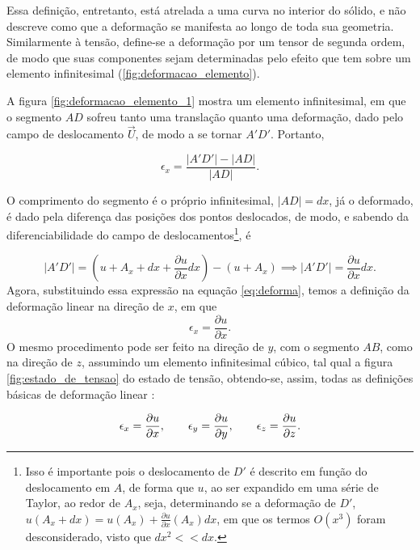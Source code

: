 Essa definição, entretanto, está atrelada a uma curva no interior do sólido, e não descreve como que a deformação se manifesta ao longo de toda sua geometria. Similarmente à tensão, define-se a deformação por um tensor de segunda ordem, de modo que suas componentes sejam determinadas pelo efeito que tem sobre um elemento infinitesimal (\ref{fig:deformacao_elemento}). \cite{roylance}

A figura \ref{fig:deformacao_elemento_1} mostra um elemento infinitesimal, em que o segmento $AD$ sofreu tanto uma translação quanto uma deformação, dado pelo campo de deslocamento $\vec{U}$, de modo a se tornar $A'D'$. Portanto,

\begin{equation}
    \epsilon_x = \frac{|A'D'| - |AD|}{|AD|}.
    \label{eq:deforma}
\end{equation}



O comprimento do segmento é o próprio infinitesimal, $|AD| = dx$, já o deformado, é dado pela diferença das posições dos pontos deslocados, de modo, e sabendo da diferenciabilidade do campo de deslocamentos\footnote{Isso é importante pois o deslocamento de $D'$ é descrito em função do deslocamento em $A$, de forma que $u$, ao ser expandido em uma série de Taylor, ao redor de $A_x$, seja, determinando se a deformação de $D'$, $u(A_x + dx) = u(A_x) + \frac{\partial u}{\partial x}(A_x) dx$, em que os termos $O(x^3)$ foram desconsiderado, visto que $dx^2 << dx$.}, é

\begin{equation}
    |A'D'| = (u + A_x + dx + \frac{\partial u}{\partial x} dx) - (u + A_x) \implies |A'D'| = \frac{\partial u}{\partial x} dx.
\end{equation}
Agora, substituindo essa expressão na equação \ref{eq:deforma}, temos a definição da deformação linear na direção de $x$, em que
\begin{equation}
    \epsilon_x = \frac{\partial u}{\partial x}.
\end{equation}
O mesmo procedimento pode ser feito na direção de $y$, com o segmento $AB$, como na direção de $z$, assumindo um elemento infinitesimal cúbico, tal qual a figura \ref{fig:estado_de_tensao} do estado de tensão, obtendo-se, assim, todas as definições básicas de deformação linear \cite{popov}:

\begin{equation}
    \epsilon_x = \frac{\partial u}{\partial x}, \qquad \epsilon_y = \frac{\partial u}{\partial y}, \qquad \epsilon_z = \frac{\partial u}{\partial z}. \\
\end{equation}


